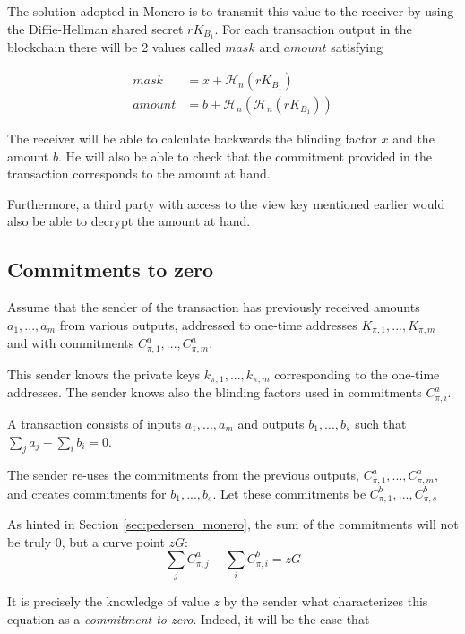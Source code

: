 The solution adopted in Monero is to transmit this value to the receiver by using the Diffie-Hellman shared
secret \(r K_{B_1}\).
For each transaction output in the blockchain there will be 2 values called \(mask\) and \(amount\)
satisfying 

\begin{align*}
  \mathit{mask}     &= x + \mathcal{H}_n (r K_{B_1}) \\
  \mathit{amount}   &= b + \mathcal{H}_n (\mathcal{H}_n (r K_{B_1}))
\end{align*}

The receiver will be able to calculate backwards the blinding factor \(x\) and the amount \(b\).
He will also be able to check that the commitment provided in the transaction corresponds to the amount at hand.

Furthermore, a third party with  access to the view key mentioned earlier would also be able
to decrypt the amount at hand.



\subsection{Commitments to zero}

Assume that the sender of the transaction has previously received amounts \(a_1, ..., a_m\)  from various outputs,
addressed to one-time addresses \(K_{\pi, 1}, ..., K_{\pi, m}\) and 
with commitments \(C^a_{\pi, 1}, ..., C^a_{\pi, m}\). 

This sender knows the
private keys \(k_{\pi, 1}, ..., k_{\pi, m}\) corresponding to the one-time addresses.
The sender knows also the blinding factors used in commitments \(C^a_{\pi, i}\).

A transaction consists of inputs \(a_1, ..., a_m\) and outputs \(b_1, ..., b_s\) such that \(\sum\limits_j a_j - \sum\limits_i b_i = 0\). 
 
The sender re-uses the commitments from the previous outputs, \(C^a_{\pi, 1}, ..., C^a_{\pi, m}\),
and creates commitments for \(b_1, ..., b_s\).
Let these commitments be \(C^b_{\pi, 1}, ..., C^b_{\pi, s}\)

As hinted in Section \ref{sec:pedersen_monero}, the sum of the commitments will not be truly 0, but a curve point \(zG\):
\[\sum\limits_j C^a_{\pi, j} -\sum\limits_i C^b_{\pi, i} = z G  \]

It is precisely the knowledge of value \(z\) by the sender 
what characterizes this equation as a {\em commitment to zero}.
Indeed, it will be the case that 


